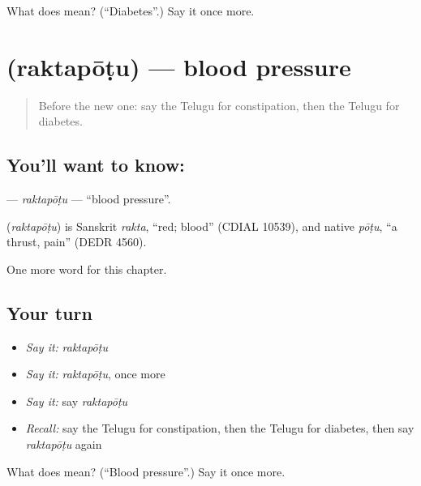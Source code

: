 \begin{tcolorbox}[breakable,colback=teal!4,colframe=teal!35!black,title={Before you move on}]
What does  mean? (\textquotedblleft{}Diabetes\textquotedblright{}.) Say it once more.
\end{tcolorbox}
\section[\texorpdfstring{\te{రక్తపోటు} (raktapōṭu)}{రక్తపోటు (raktapōṭu)}]{ (raktapōṭu) — blood pressure}

\label{lesson:TE-C288-raktapotu}



\begin{quote}
Before the new one: say the Telugu for constipation, then the Telugu for diabetes.
\end{quote}

\subsection*{You'll want to know: }
\textbf{} — \emph{raktapōṭu} — \textquotedblleft{}blood pressure\textquotedblright{}.

\begin{cousinweb}
\textbf{} (\emph{raktapōṭu}) is Sanskrit \emph{rakta}, \textquotedblleft{}red; blood\textquotedblright{} (CDIAL 10539), and native \emph{pōṭu}, \textquotedblleft{}a thrust, pain\textquotedblright{} (DEDR 4560).
\end{cousinweb}

\begin{grammarlens}[title={What you've built}]
One more word for this chapter.
\end{grammarlens}

\subsection*{Your turn}
\begin{itemize}
\raggedright
  \item \emph{Say it:} \emph{raktapōṭu}
  \item \emph{Say it:} \emph{raktapōṭu}, once more
  \item \emph{Say it:} say \emph{raktapōṭu}
  \item \emph{Recall:} say the Telugu for constipation, then the Telugu for diabetes, then say \emph{raktapōṭu} again
\end{itemize}

\begin{tcolorbox}[breakable,colback=teal!4,colframe=teal!35!black,title={Before you move on}]
What does  mean? (\textquotedblleft{}Blood pressure\textquotedblright{}.) Say it once more.
\end{tcolorbox}
